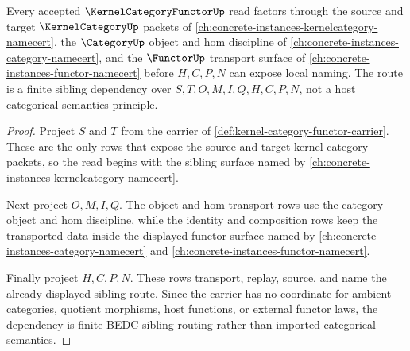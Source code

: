 \begin{theorem}
\label{thm:kernel-category-functor-sibling-route}
Every accepted $\KernelCategoryFunctorUp$ read factors through the source and target $\KernelCategoryUp$ packets of \autoref{ch:concrete-instances-kernelcategory-namecert}, the $\CategoryUp$ object and hom discipline of \autoref{ch:concrete-instances-category-namecert}, and the $\FunctorUp$ transport surface of \autoref{ch:concrete-instances-functor-namecert} before $H,C,P,N$ can expose local naming. The route is a finite sibling dependency over $S,T,O,M,I,Q,H,C,P,N$, not a host categorical semantics principle.
\end{theorem}
\begin{proof}
Project $S$ and $T$ from the carrier of \autoref{def:kernel-category-functor-carrier}. These are the only rows that expose the source and target kernel-category packets, so the read begins with the sibling surface named by \autoref{ch:concrete-instances-kernelcategory-namecert}.

Next project $O,M,I,Q$. The object and hom transport rows use the category object and hom discipline, while the identity and composition rows keep the transported data inside the displayed functor surface named by \autoref{ch:concrete-instances-category-namecert} and \autoref{ch:concrete-instances-functor-namecert}.

Finally project $H,C,P,N$. These rows transport, replay, source, and name the already displayed sibling route. Since the carrier has no coordinate for ambient categories, quotient morphisms, host functions, or external functor laws, the dependency is finite BEDC sibling routing rather than imported categorical semantics.
\end{proof}



